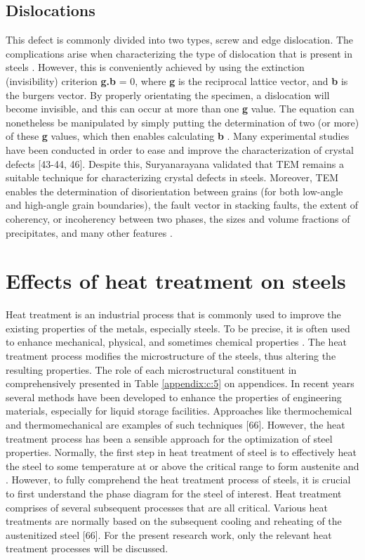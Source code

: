 \documentclass[12pt]{report}
\begin{document}
\subsection{Dislocations}   
This defect is commonly divided into two types, screw and edge dislocation. The complications arise when characterizing the type of dislocation that is present in steels \cite{jones2012engineering}. However, this is conveniently achieved by using the extinction (invisibility) criterion \textbf{g.b} = 0, where \textbf{g} is the reciprocal lattice vector, and \textbf{b} is the burgers vector. By properly orientating the specimen, a dislocation will become invisible, and this can occur at more than one \textbf{g} value. The equation can nonetheless be manipulated by simply putting the determination of two (or more) of these \textbf{g} values, which then enables calculating \textbf{b} \cite{suryanarayana2017microstructure}. 
Many experimental studies have been conducted in order to ease and improve the characterization of crystal defects [43-44, 46]. Despite this, Suryanarayana \cite{suryanarayana2017microstructure} validated that TEM remains a suitable technique for characterizing crystal defects in steels. Moreover, TEM enables the determination of disorientation between grains (for both low-angle and high-angle grain boundaries), the fault vector in stacking faults, the extent of coherency, or incoherency between two phases, the sizes and volume fractions of precipitates, and many other features \cite{suryanarayana2017microstructure}.

\section{Effects of heat treatment on steels} 
Heat treatment is an industrial process that is commonly used to improve the existing properties of the metals, especially steels. To be precise, it is often used to enhance mechanical, physical, and sometimes chemical properties \cite{mampuya2021effect}. The heat treatment process modifies the microstructure of the steels, thus altering the resulting properties. The role of each microstructural constituent in comprehensively presented in Table \ref{appendix:c:5} on appendices. In recent years several methods have been developed to enhance the properties of engineering materials, especially for liquid storage facilities. Approaches like thermochemical and thermomechanical are examples of such techniques [66]. However, the heat treatment process has been a sensible approach for the optimization of steel properties.
Normally, the first step in heat treatment of steel is to effectively heat the steel to some temperature at or above the critical range to form austenite and  \cite{mampuya2021effect}. However, to fully comprehend the heat treatment process of steels, it is crucial to first understand the phase diagram for the steel of interest. Heat treatment comprises of several subsequent processes that are all critical. Various heat treatments are normally based on the subsequent cooling and reheating of the austenitized steel [66].  For the present research work, only the relevant heat treatment processes will be discussed.
\end{document}
